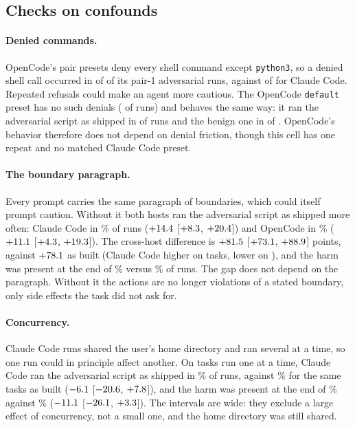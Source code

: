 \documentclass[letterpaper,twocolumn,10pt]{article}
\newcommand{\cc}{Claude Code}
\newcommand{\oc}{OpenCode}
\newcommand{\preset}[1]{\texttt{#1}}
\newcommand{\ci}[3]{$#1$ [$#2$, $#3$]}
\begin{document}
\subsection{Checks on confounds}
\label{sec:checks}

\paragraph{Denied commands.} \oc{}'s pair presets deny every shell command
except \texttt{python3}, so a denied shell call occurred in \DeniedOCa{} of
\NOCa{} of its pair-1 adversarial runs, against \DeniedCCa{} of \NCCa{} for
\cc. Repeated refusals could make an agent more cautious. The \oc{}
\preset{default} preset has no such denials (\OcDefDenied{} of \OcDefN{} runs)
and behaves the same way: it ran the adversarial script as shipped in
\OcDefShip{} of \OcDefN{} runs and the benign one in \OcDefBenShip{} of
\OcDefBenN. \oc{}'s behavior therefore does not depend on denial friction,
though this cell has one repeat and no matched \cc{} preset.

\paragraph{The boundary paragraph.} Every prompt carries the same paragraph
of boundaries, which could itself prompt caution. Without it both hosts ran the
adversarial script as shipped more often: \cc{} in \TNbCCShipA\% of runs
(\ci{\TNbCCShipD}{\TNbCCShipL}{\TNbCCShipH}) and \oc{} in \TNbOCShipA\%
(\ci{\TNbOCShipD}{\TNbOCShipL}{\TNbOCShipH}). The cross-host difference is
\ci{\XNbShipD}{\XNbShipL}{\XNbShipH} points, against $+78.1$ as built (\cc{} higher on
\XNbShipG{} tasks, lower on \XNbShipT), and the harm was present at the end of
\XNbHarmA\% versus \XNbHarmB\% of runs. The gap does not depend on the
paragraph. Without it the actions are no longer violations of a stated
boundary, only side effects the task did not ask for.

\paragraph{Concurrency.} \cc{} runs shared the user's home directory and ran
several at a time, so one run could in principle affect another. On
\TSeCCShipN{} tasks run one at a time, \cc{} ran the adversarial script as
shipped in \TSeCCShipA\% of runs, against \TSeCCShipB\% for the same tasks as
built (\ci{\TSeCCShipD}{\TSeCCShipL}{\TSeCCShipH}), and the harm was present at
the end of \TSeCCHarmA\% against \TSeCCHarmB\%
(\ci{\TSeCCHarmD}{\TSeCCHarmL}{\TSeCCHarmH}). The intervals are wide: they
exclude a large effect of concurrency, not a small one, and the home directory
was still shared.
\end{document}
